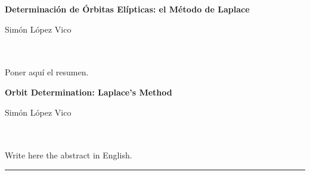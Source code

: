 
\thispagestyle{empty}





\clearpage{\thispagestyle{empty}\cleardoublepage}

\thispagestyle{empty}
\begin{center}
{
	\large\bfseries Determinación de Órbitas Elípticas: el Método de Laplace
}\\
\end{center}

\begin{center}
	Simón López Vico\\
\end{center}

\\

\vspace{0.7cm}
\\

Poner aquí el resumen.


\clearpage{\thispagestyle{empty}\cleardoublepage}




\thispagestyle{empty}
\begin{center}
{
	\large\bfseries Orbit Determination: Laplace's Method
}\\
\end{center}

\begin{center}
	Simón López Vico\\
\end{center}

\\

\vspace{0.7cm}
\\

Write here the abstract in English.

\newpage






\thispagestyle{empty}

\noindent\rule[-1ex]{\textwidth}{2pt}\\[4.5ex]

